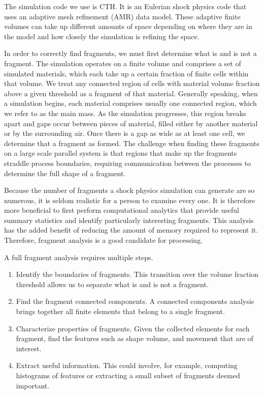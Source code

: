 The simulation code we use is CTH.  It is an Eulerian
shock physics code that uses an adaptive mesh refinement (AMR) data model.
These adaptive finite volumes can take up different amounts of space
depending on where they are in the model and how closely the simulation is
refining the space.

In order to correctly find fragments, we must first determine what is and
is not a fragment.  The simulation operates on a finite volume and
comprises a set of simulated materials, which each take up a certain
fraction of finite cells within that volume.  We treat any connected region
of cells with material volume fraction above a given threshold as a
fragment of that material.  Generally speaking, when a simulation begins,
each material comprises usually one connected region, which we refer to as
the main mass.  As the simulation progresses, this region breaks apart and
gaps occur between pieces of material, filled either by another material or
by the surrounding air.  Once there is a gap as wide as at least one cell,
we determine that a fragment as formed.  The challenge when finding these
fragments on a large scale parallel system is that regions that make up the
fragments straddle process boundaries, requiring communication between the
processes to determine the full shape of a fragment.

Because the number of fragments a shock physics simulation can generate are
so numerous, it is seldom realistic for a person to examine every one.  It
is therefore more beneficial to first perform computational analytics that
provide useful summary statistics and identify particularly interesting
fragments.  This analysis has the added benefit of reducing the amount of
memory required to represent it.  Therefore, fragment analysis is a good
candidate for \insitu processing.

A full fragment analysis requires multiple steps.
\begin{enumerate}
\item Identify the boundaries of fragments.  This transition over the
  volume fraction threshold allows us to separate what is and is not a
  fragment.
\item Find the fragment connected components.  A connected components
  analysis brings together all finite elements that belong to a single
  fragment.
\item Characterize properties of fragments.  Given the collected elements
  for each fragment, find the features such as shape volume, and movement
  that are of interest.
\item Extract useful information.  This could involve, for example,
  computing histograms of features or extracting a small subset of
  fragments deemed important.
\end{enumerate}

